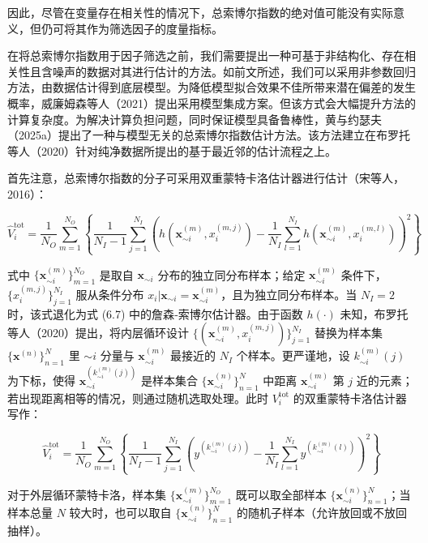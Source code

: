 \documentclass{ctexart}
\begin{document}
因此，尽管在变量存在相关性的情况下，总索博尔指数的绝对值可能没有实际意义，但仍可将其作为筛选因子的度量指标。

在将总索博尔指数用于因子筛选之前，我们需要提出一种可基于非结构化、存在相关性且含噪声的数据对其进行估计的方法。如前文所述，我们可以采用非参数回归方法，由数据估计得到底层模型。为降低模型拟合效果不佳所带来潜在偏差的发生概率，威廉姆森等人（2021）提出采用模型集成方案。但该方式会大幅提升方法的计算复杂度。为解决计算负担问题，同时保证模型具备鲁棒性，黄与约瑟夫（2025a）提出了一种与模型无关的总索博尔指数估计方法。该方法建立在布罗托等人（2020）针对纯净数据所提出的基于最近邻的估计流程之上。

首先注意，总索博尔指数的分子可采用双重蒙特卡洛估计器进行估计（宋等人，2016）：

\begin{equation*}
\widehat{V}_i^{\mathrm{tot}}=\frac{1}{N_O}\sum_{m=1}^{N_O}\left\{\frac{1}{N_I-1}\sum_{j=1}^{N_I}\left(h(\boldsymbol{x}^{(m)}_{\sim i},x^{(m,j)}_i)-\frac{1}{N_I}\sum_{l=1}^{N_I}h(\boldsymbol{x}^{(m)}_{\sim i},x^{(m,l)}_i)\right)^2\right\}
\tag{11.3}
\end{equation*}

式中 $\{\boldsymbol{x}^{(m)}_{\sim i}\}_{m=1}^{N_O}$ 是取自 $\boldsymbol{x}_{\sim i}$ 分布的独立同分布样本；给定 $\boldsymbol{x}^{(m)}_{\sim i}$ 条件下，$\{x^{(m,j)}_i\}_{j=1}^{N_I}$ 服从条件分布 $x_i|\boldsymbol{x}_{\sim i}=\boldsymbol{x}^{(m)}_{\sim i}$，且为独立同分布样本。当 $N_I=2$ 时，该式退化为式 (6.7) 中的詹森‑索博尔估计器。由于函数 $h(\cdot)$ 未知，布罗托等人（2020）提出，将内层循环设计 $\{(\boldsymbol{x}^{(m)}_{\sim i},x^{(m,j)}_i)\}_{j=1}^{N_I}$ 替换为样本集 $\{\boldsymbol{x}^{(n)}\}_{n=1}^{N}$ 里 ${\sim i}$ 分量与 $\boldsymbol{x}^{(m)}_{\sim i}$ 最接近的 $N_I$ 个样本。更严谨地，设 $k^{(m)}_{\sim i}(j)$ 为下标，使得 $\boldsymbol{x}^{(k^{(m)}_{\sim i}(j))}_{\sim i}$ 是样本集合 $\{\boldsymbol{x}^{(n)}_{\sim i}\}_{n=1}^{N}$ 中距离 $\boldsymbol{x}^{(m)}_{\sim i}$ 第 $j$ 近的元素；若出现距离相等的情况，则通过随机选取处理。此时 $V_i^{\mathrm{tot}}$ 的双重蒙特卡洛估计器写作：

\begin{equation*}
\widehat{V}_i^{\mathrm{tot}}=\frac{1}{N_O}\sum_{m=1}^{N_O}\left\{\frac{1}{N_I-1}\sum_{j=1}^{N_I}\left(y^{(k^{(m)}_{\sim i}(j))}-\frac{1}{N_I}\sum_{l=1}^{N_I}y^{(k^{(m)}_{\sim i}(l))}\right)^2\right\}
\tag{11.4}
\end{equation*}

对于外层循环蒙特卡洛，样本集 $\{\boldsymbol{x}^{(m)}_{\sim i}\}_{m=1}^{N_O}$ 既可以取全部样本 $\{\boldsymbol{x}^{(n)}_{\sim i}\}_{n=1}^{N}$；当样本总量 $N$ 较大时，也可以取自 $\{\boldsymbol{x}^{(n)}_{\sim i}\}_{n=1}^{N}$ 的随机子样本（允许放回或不放回抽样）。
\end{document}
